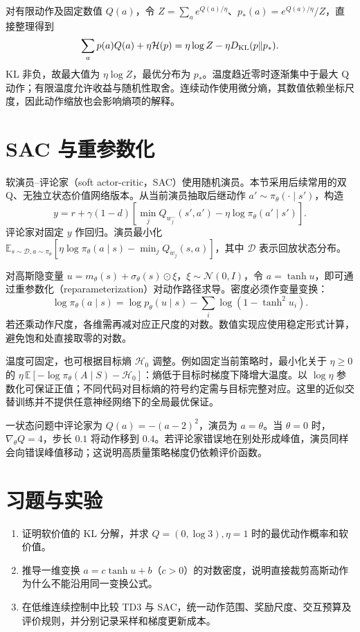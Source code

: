 对有限动作及固定数值 $Q(a)$，令 $Z=\sum_a e^{Q(a)/\eta}$、$p_*(a)=e^{Q(a)/\eta}/Z$，直接整理得到
\[
\sum_a p(a)Q(a)+\eta\mathcal H(p)
=\eta\log Z-\eta D_{\rm KL}(p\|p_*).
\]
KL 非负，故最大值为 $\eta\log Z$，最优分布为 $p_*$。温度趋近零时逐渐集中于最大 Q 动作；有限温度允许收益与随机性取舍。连续动作使用微分熵，其数值依赖坐标尺度，因此动作缩放也会影响熵项的解释。

\section{SAC 与重参数化}

软演员--评论家（soft actor-critic，SAC）使用随机演员。本节采用后续常用的双 Q、无独立状态价值网络版本\cite{haarnoja-sac-applications}。从当前演员抽取后继动作 $a'\sim\pi_\theta(\cdot\mid s')$，构造
\[
y=r+\gamma(1-d)\left[\min_jQ_{w_j^-}(s',a')-\eta\log\pi_\theta(a'\mid s')\right].
\]
评论家对固定 $y$ 作回归。演员最小化 $\mathbb E_{s\sim\mathcal D,a\sim\pi_\theta}[\eta\log\pi_\theta(a\mid s)-\min_jQ_{w_j}(s,a)]$，其中 $\mathcal D$ 表示回放状态分布。

对高斯隐变量 $u=m_\theta(s)+\sigma_\theta(s)\odot\xi$，$\xi\sim\mathcal N(0,I)$，令 $a=\tanh u$，即可通过重参数化（reparameterization）对动作路径求导。密度必须作变量变换：
\[
\log\pi_\theta(a\mid s)=\log p_\theta(u\mid s)-\sum_i\log(1-\tanh^2u_i).
\]
若还乘动作尺度，各维需再减对应正尺度的对数。数值实现应使用稳定形式计算，避免饱和处直接取零的对数。

温度可固定，也可根据目标熵 $\mathcal H_0$ 调整。例如固定当前策略时，最小化关于 $\eta\geq0$ 的 $\eta\,\mathbb E[-\log\pi_\theta(A\mid S)-\mathcal H_0]$：熵低于目标时梯度下降增大温度。以 $\log\eta$ 参数化可保证正值；不同代码对目标熵的符号约定需与目标完整对应。这里的近似交替训练并不提供任意神经网络下的全局最优保证。

\begin{example}[连续动作的梯度方向]
一状态问题中评论家为 $Q(a)=-(a-2)^2$，演员为 $a=\theta$。当 $\theta=0$ 时，$\nabla_\theta Q=4$，步长 $0.1$ 将动作移到 $0.4$。若评论家错误地在别处形成峰值，演员同样会向错误峰值移动；这说明高质量策略梯度仍依赖评价函数。
\end{example}

\section{习题与实验}
\begin{enumerate}
\item 证明软价值的 KL 分解，并求 $Q=(0,\log3),\eta=1$ 时的最优动作概率和软价值。
\item 推导一维变换 $a=c\tanh u+b$（$c>0$）的对数密度，说明直接裁剪高斯动作为什么不能沿用同一变换公式。
\item 在低维连续控制中比较 TD3 与 SAC，统一动作范围、奖励尺度、交互预算及评价规则，并分别记录采样和梯度更新成本。
\end{enumerate}




